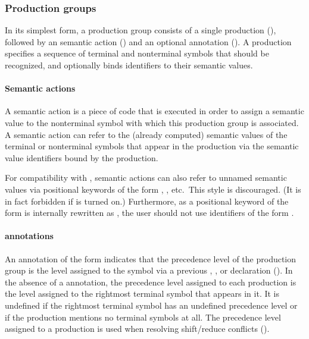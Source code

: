 \documentclass[onecolumn,11pt,nocopyrightspace,preprint]{sigplanconf}
\begin{document}
\subsubsection{Production groups}
\label{sec:productiongroups}

In its simplest form, a production group consists of a single production (),
followed by an \ocaml semantic action () and an optional
\dprec annotation (). A production specifies a sequence of terminal and
nonterminal symbols that should be recognized, and optionally binds
identifiers to their semantic values.

\paragraph{Semantic actions}
\label{sec:actions}

A semantic action is a piece of \ocaml code that is executed in order to
assign a semantic value to the nonterminal symbol with which this production
group is associated. A semantic action can refer to the (already computed)
semantic values of the terminal or nonterminal symbols that appear in the
production via the semantic value identifiers bound by the production.

For compatibility with \ocamlyacc, semantic actions can also refer to
unnamed semantic values via positional keywords of the form
, , etc.\ This style is discouraged.
(It is in fact forbidden if \onodollars is turned on.)
Furthermore, as
a positional keyword of the form  is internally rewritten as
, the user should not use identifiers of the form .

\paragraph{\dprec annotations}
\label{sec:prec}

An annotation of the form \dprec {} indicates that the precedence level
of the production group is the level assigned to the symbol  via a
previous \dnonassoc, \dleft, or \dright declaration (). In the
absence of a
\dprec annotation, the precedence level assigned to each production is the
level assigned to the rightmost terminal symbol that appears in it. It is
undefined if the rightmost terminal symbol has an undefined precedence level
or if the production mentions no terminal symbols at all. The precedence level
assigned to a production is used when resolving shift/reduce conflicts
().
\end{document}
